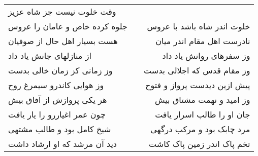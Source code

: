 \begin{center}
\begin{longtable}{l p{0.5cm} r}
وقت خلوت نیست جز شاه عزیز
\\
جلوه کرده خاص و عامان را عروس
&&
خلوت اندر شاه باشد با عروس
\\
هست بسیار اهل حال از صوفیان
&&
نادرست اهل مقام اندر میان
\\
از منازلهای جانش یاد داد
&&
وز سفرهای روانش یاد داد
\\
وز زمانی کز زمان خالی بدست
&&
وز مقام قدس که اجلالی بدست
\\
وز هوایی کاندرو سیمرغ روح
&&
پیش ازین دیدست پرواز و فتوح
\\
هر یکی پروازش از آفاق بیش
&&
وز امید و نهمت مشتاق بیش
\\
چون عمر اغیاررو را یار یافت
&&
جان او را طالب اسرار یافت
\\
شیخ کامل بود و طالب مشتهی
&&
مرد چابک بود و مرکب درگهی
\\
دید آن مرشد که او ارشاد داشت
&&
تخم پاک اندر زمین پاک کاشت
\\
\end{longtable}
\end{center}
